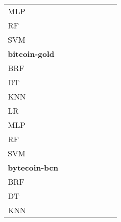 \documentclass{article}
\begin{document}
{\begin{tabular}{|l|c|c|c|c|c|c|c|}
MLP & \cellcolor{white}  & \cellcolor{white}  & \cellcolor{white}  & \cellcolor{white}  & \cellcolor{gray}  & \cellcolor{white}  & \cellcolor{white}  \\ 
RF & \cellcolor{white}  & \cellcolor{white}  & \cellcolor{white}  & \cellcolor{black}  & \cellcolor{black}  & \cellcolor{gray}  & \cellcolor{black}  \\ 
SVM & \cellcolor{white}  & \cellcolor{white}  & \cellcolor{white}  & \cellcolor{white}  & \cellcolor{black}  & \cellcolor{white}  & \cellcolor{gray}  \\ 
\hline
\textbf{bitcoin-gold} \\ \hline
BRF & \cellcolor{gray}  & \cellcolor{white}  & \cellcolor{white}  & \cellcolor{black}  & \cellcolor{black}  & \cellcolor{white}  & \cellcolor{white}  \\ 
DT & \cellcolor{white}  & \cellcolor{gray}  & \cellcolor{white}  & \cellcolor{black}  & \cellcolor{white}  & \cellcolor{white}  & \cellcolor{black}  \\ 
KNN & \cellcolor{white}  & \cellcolor{white}  & \cellcolor{gray}  & \cellcolor{black}  & \cellcolor{black}  & \cellcolor{white}  & \cellcolor{black}  \\ 
LR & \cellcolor{white}  & \cellcolor{white}  & \cellcolor{white}  & \cellcolor{gray}  & \cellcolor{white}  & \cellcolor{white}  & \cellcolor{white}  \\ 
MLP & \cellcolor{white}  & \cellcolor{white}  & \cellcolor{white}  & \cellcolor{black}  & \cellcolor{gray}  & \cellcolor{white}  & \cellcolor{white}  \\ 
RF & \cellcolor{white}  & \cellcolor{white}  & \cellcolor{white}  & \cellcolor{white}  & \cellcolor{black}  & \cellcolor{gray}  & \cellcolor{white}  \\ 
SVM & \cellcolor{white}  & \cellcolor{white}  & \cellcolor{white}  & \cellcolor{black}  & \cellcolor{white}  & \cellcolor{white}  & \cellcolor{gray}  \\ 
\hline
\textbf{bytecoin-bcn} \\ \hline
BRF & \cellcolor{gray}  & \cellcolor{white}  & \cellcolor{white}  & \cellcolor{black}  & \cellcolor{black}  & \cellcolor{white}  & \cellcolor{white}  \\ 
DT & \cellcolor{white}  & \cellcolor{gray}  & \cellcolor{white}  & \cellcolor{black}  & \cellcolor{black}  & \cellcolor{white}  & \cellcolor{black}  \\ 
KNN & \cellcolor{white}  & \cellcolor{white}  & \cellcolor{gray}  & \cellcolor{black}  & \cellcolor{black}  & \cellcolor{white}  & \cellcolor{white}  \\ 

\end{tabular}}
\end{document}
